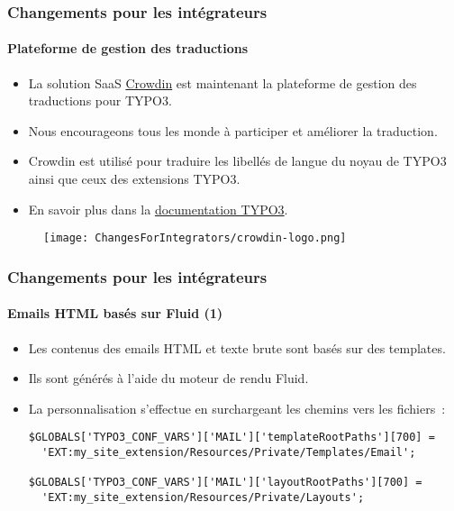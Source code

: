 
\begin{frame}[fragile]
	\frametitle{Changements pour les intégrateurs}
	\framesubtitle{Plateforme de gestion des traductions}

	\begin{itemize}
		\item La solution SaaS \href{https://crowdin.com/}{Crowdin} est maintenant la
			plateforme de gestion des traductions pour TYPO3.
		\item Nous encourageons tous les monde à participer et améliorer la traduction.
		\item Crowdin est utilisé pour traduire les libellés de langue du noyau de TYPO3
			ainsi que ceux des extensions TYPO3.
		\item En savoir plus dans la
			\href{https://docs.typo3.org/m/typo3/reference-coreapi/master/en-us/ApiOverview/Internationalization/TranslationServer/Crowdin.html}{documentation TYPO3}.
	\end{itemize}

	\begin{figure}
		\texttt{[image: ChangesForIntegrators/crowdin-logo.png]}
	\end{figure}

\end{frame}


\begin{frame}[fragile]
	\frametitle{Changements pour les intégrateurs}
	\framesubtitle{Emails HTML basés sur Fluid (1)}

	\lstset{basicstyle=\smaller\ttfamily}

	\begin{itemize}
		\item Les contenus des emails HTML et texte brute sont basés sur des templates.
		\item Ils sont générés à l'aide du moteur de rendu Fluid.
		\item La personnalisation s'effectue en surchargeant les chemins vers les fichiers~:

\vspace{-0.4cm}
\begin{lstlisting}
$GLOBALS['TYPO3_CONF_VARS']['MAIL']['templateRootPaths'][700] =
  'EXT:my_site_extension/Resources/Private/Templates/Email';

$GLOBALS['TYPO3_CONF_VARS']['MAIL']['layoutRootPaths'][700] =
  'EXT:my_site_extension/Resources/Private/Layouts';
\end{lstlisting}

	\end{itemize}

\end{frame}

